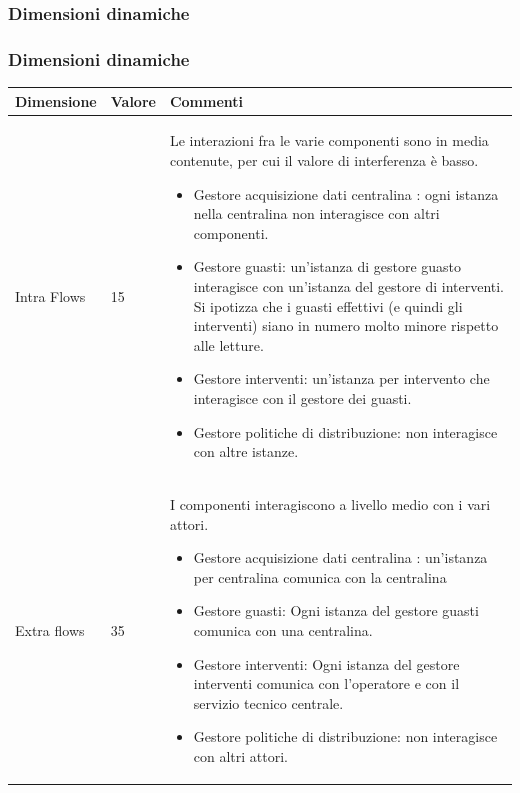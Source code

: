 \documentclass{beamer}
\begin{document}
	\subsubsection{Dimensioni dinamiche}
	\begin{frame}[allowframebreaks]
		\frametitle{Dimensioni dinamiche}			
		\begin{center}
			\begin{table}
				\tiny
				\centering
				{\renewcommand{\arraystretch}{1.2}
					
					\begin{tabular}{|M{0.1\textwidth}|M{0.1\textwidth}|p{.6\textwidth}|}
						\hline
						Dimensione & Valore & Commenti \\
						\hline
						Intra Flows & 15 & Le interazioni fra le varie componenti sono in media contenute, per cui il valore di interferenza è basso.
						\begin{itemize}
							\item Gestore acquisizione dati centralina : ogni istanza nella centralina non interagisce con altri componenti.
							\item Gestore guasti: un'istanza di gestore guasto interagisce con un'istanza del gestore di interventi. Si ipotizza che i guasti effettivi (e quindi gli interventi) siano in numero molto minore rispetto alle letture.
							\item Gestore interventi: un'istanza per intervento che interagisce con il gestore dei guasti.
							\item Gestore politiche di distribuzione: non interagisce con altre istanze.
						\end{itemize} \\
						Extra flows & 35 & I componenti interagiscono a livello medio con i vari attori.
						\begin{itemize}
							\item Gestore acquisizione dati centralina : un'istanza per centralina comunica con la centralina
							\item Gestore guasti: Ogni istanza del gestore guasti comunica con una centralina.
							\item Gestore interventi: Ogni istanza del gestore interventi comunica con l'operatore e con il servizio tecnico centrale.
							\item Gestore politiche di distribuzione: non interagisce con altri attori.
						\end{itemize} \\

\end{tabular}}
\end{table}
\end{center}
\end{frame}
\end{document}
